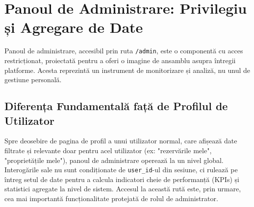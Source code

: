 \documentclass[12pt, a4paper, oneside, romanian]{teza-upb}
\begin{document}
\section{Panoul de Administrare: Privilegiu și Agregare de Date}
Panoul de administrare, accesibil prin ruta \texttt{/admin}, este o componentă cu acces restricționat, proiectată pentru a oferi o imagine de ansamblu asupra întregii platforme. Acesta reprezintă un instrument de monitorizare și analiză, nu unul de gestiune personală.

\subsection{Diferența Fundamentală față de Profilul de Utilizator}
Spre deosebire de pagina de profil a unui utilizator normal, care afișează date filtrate și relevante doar pentru acel utilizator (ex: "rezervările mele", "proprietățile mele"), panoul de administrare operează la un nivel global. Interogările sale nu sunt condiționate de \texttt{user\_id}-ul din sesiune, ci rulează pe întreg setul de date pentru a calcula indicatori cheie de performanță (KPIs) și statistici agregate la nivel de sistem. Accesul la această rută este, prin urmare, cea mai importantă funcționalitate protejată de rolul de administrator.
\end{document}
